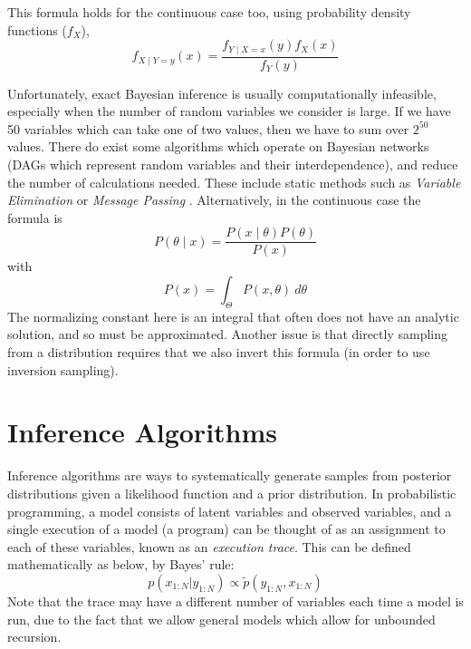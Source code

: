 This formula holds for the continuous case too, using probability density functions ($f_X$),
% 
$$ f_{X\mid Y=y}(x)={\frac {f_{Y\mid X=x}(y)f_{X}(x)}{f_{Y}(y)}} $$
% 


Unfortunately, exact Bayesian inference is usually computationally infeasible, especially when the number of random variables we consider is large. If we have 50 variables which can take one of two values, then we have to sum over $2^{50}$ values. There do exist some algorithms which operate on Bayesian networks (DAGs which represent random variables and their interdependence), and reduce the number of calculations needed. These include static methods such as \textit{Variable Elimination} or \textit{Message Passing} \cite{belief-prop}.
% 
Alternatively, in the continuous case the formula is
% 
$$P(\theta\mid x)=\frac{P(x\mid\theta)P(\theta)}{P(x)}$$
with 
$$P(x)=\int_{\Theta}P(x,\theta)~d\theta $$
% 
The normalizing constant here is an integral that often does not have an analytic solution, and so must be approximated. Another issue is that directly sampling from a distribution requires that we also invert this formula (in order to use inversion sampling).
% 
\section{Inference Algorithms}
	
Inference algorithms are ways to systematically generate samples from posterior distributions given a likelihood function and a prior distribution. In probabilistic programming, a model consists of latent variables and observed variables, and a single execution of a model (a program) can be thought of as an assignment to each of these variables, known as an \textit{execution trace}. This can be defined mathematically as below, by Bayes' rule:
% 
$$p(x_{1:N}|y_{1:N})\propto \tilde{p}(y_{1:N},x_{1:N})$$ 
% 
Note that the trace may have a different number of variables each time a model is run, due to the fact that we allow general models which allow for unbounded recursion. 

